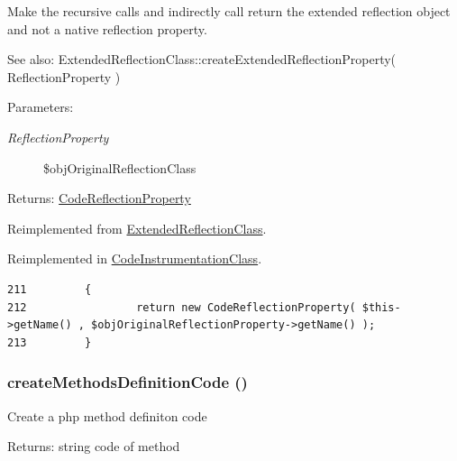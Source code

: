 Make the recursive calls and indirectly call return the extended reflection object and not a native reflection property.

\begin{Desc}
\item[See also:]ExtendedReflectionClass::createExtendedReflectionProperty( ReflectionProperty ) \end{Desc}
\begin{Desc}
\item[Parameters:]
\begin{description}
\item[{\em ReflectionProperty}]\$objOriginalReflectionClass \end{description}
\end{Desc}
\begin{Desc}
\item[Returns:]\hyperlink{class_code_reflection_property}{CodeReflectionProperty} \end{Desc}


Reimplemented from \hyperlink{class_extended_reflection_class_bce271bf4f7b77b8b11986404241ab5c}{ExtendedReflectionClass}.

Reimplemented in \hyperlink{class_code_instrumentation_class_bce271bf4f7b77b8b11986404241ab5c}{CodeInstrumentationClass}.

\begin{Code}\begin{verbatim}211         {
212                 return new CodeReflectionProperty( $this->getName() , $objOriginalReflectionProperty->getName() );
213         }
\end{verbatim}
\end{Code}


\hypertarget{class_code_reflection_class_c2d23f8614e24561b794d5031001eaf8}{
\subsubsection[{createMethodsDefinitionCode}]{\setlength{\rightskip}{0pt plus 5cm}createMethodsDefinitionCode ()}}
\label{class_code_reflection_class_c2d23f8614e24561b794d5031001eaf8}


Create a php method definiton code

\begin{Desc}
\item[Returns:]string code of method \end{Desc}


